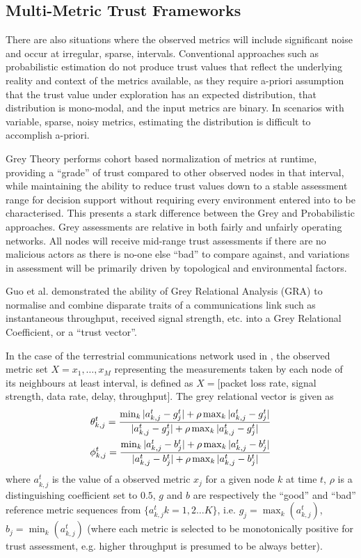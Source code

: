 \documentclass[conference]{IEEEtran}
\begin{document}
\subsection{Multi-Metric Trust Frameworks}\label{sec:multimetrictrust}

There are also situations where the observed metrics will include significant noise and occur at irregular, sparse, intervals.
Conventional approaches such as probabilistic estimation do not produce trust values that reflect the underlying reality and context of the metrics available, as they require a-priori assumption that the trust value under exploration has an expected distribution, that distribution is mono-modal, and the input metrics are binary.
In scenarios with variable, sparse, noisy metrics, estimating the distribution is difficult to accomplish a-priori.

Grey Theory performs cohort based normalization of metrics at runtime, providing a ``grade'' of trust compared to other observed nodes in that interval, while maintaining the ability to reduce trust values down to a stable assessment range for decision support without requiring every environment entered into to be characterised.
This presents a stark difference between the Grey and Probabilistic approaches.
Grey assessments are relative in both fairly and unfairly operating networks.
All nodes will receive mid-range trust assessments if there are no malicious actors as there is no-one else ``bad'' to compare against, and variations in assessment will be primarily driven by topological and environmental factors.

Guo et al. \cite{Guo11} demonstrated the ability of Grey Relational Analysis (GRA) \cite{Zuo1995} to normalise and combine disparate traits of a communications link such as instantaneous throughput, received signal strength, etc. into a Grey Relational Coefficient, or a ``trust vector''.

In the case of the terrestrial communications network used in \cite{Guo11}, the observed metric set $X = {x_1,\dots,x_M}$ representing the measurements taken by each node of its neighbours at least interval, is defined as $X=[$packet loss rate, signal strength, data rate, delay, throughput$]$.
The grey relational vector is given as
%
\begin{align}
  \label{eq:grc}
  \theta_{k,j}^t = \frac{\min_k|a_{k,j}^t - g_j^t| + \rho \max_k|a_{k,j}^t-g_j^t|}{|a_{k,j}^t-g_j^t| + \rho \max_k|a_{k,j}^t-g_j^t|} \\
  \phi_{k,j}^t = \frac{\min_k|a_{k,j}^t - b_j^t| + \rho \max_k|a_{k,j}^t-b_j^t|}{|a_{k,j}^t-b_j^t| + \rho \max_k|a_{k,j}^t-b_j^t|} \notag 
\end{align}
%
where $a_{k,j}^t$ is the value of a observed metric $x_j$ for a given node $k$ at time $t$, $\rho$ is a distinguishing coefficient set to $0.5$, $g$ and $b$ are respectively the ``good'' and ``bad'' reference metric sequences from $\{a_{k,j}^t k=1,2\dots K\}$, i.e. $g_j=\max_k({a_{k,j}^t})$,  $b_j=\min_k({a_{k,j}^t})$ (where each metric is selected to be monotonically positive for trust assessment, e.g. higher throughput is presumed to be always better). 
\end{document}
